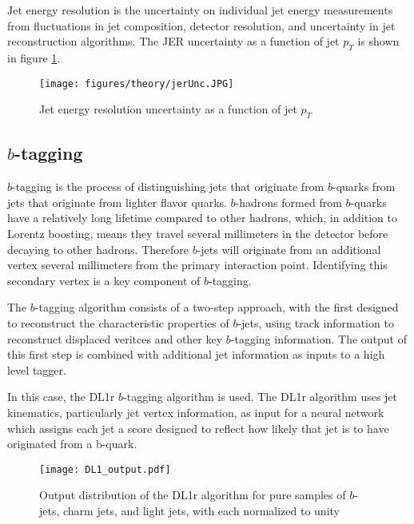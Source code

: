 Jet energy resolution is the uncertainty on individual jet energy measurements from fluctuations in jet composition, detector resolution, and uncertainty in jet reconstruction algorithms. The JER uncertainty as a function of jet $p_T$ is shown in figure \ref{fig:jerUnc}.

\begin{figure}[H]
\centering
   \texttt{[image: figures/theory/jerUnc.JPG]}
\caption{Jet energy resolution uncertainty as a function of jet $p_T$ \cite{atlascollaboration2020jet}}
\label{fig:jerUnc}
\end{figure}

\subsection{$b$-tagging}
\label{obj:bjets}

$b$-tagging is the process of distinguishing jets that originate from $b$-quarks from jets that originate from lighter flavor quarks. $b$-hadrons formed from $b$-quarks have a relatively long lifetime compared to other hadrons, which, in addition to Lorentz boosting, means they travel several millimeters in the detector before decaying to other hadrons. Therefore $b$-jets will originate from an additional vertex several millimeters from the primary interaction point. Identifying this secondary vertex is a key component of $b$-tagging.

The $b$-tagging algorithm consists of a two-step approach, with the first designed to reconstruct the characteristic properties of $b$-jets, using track information to reconstruct displaced veritces \cite{Heer:2017kbn} and other key $b$-tagging information. The output of this first step is combined with additional jet information as inputs to a high level tagger.

In this case, the DL1r $b$-tagging algorithm is used. The DL1r algorithm \cite{btag_cal} uses jet kinematics, particularly jet vertex information, as input for a neural network which assigns each jet a score designed to reflect how likely that jet is to have originated from a b-quark. 

\begin{figure}[H] 
    \centering
    \texttt{[image: DL1\_output.pdf]} 
    \caption{Output distribution of the DL1r algorithm for pure samples of $b$-jets, charm jets, and light jets, with each normalized to unity \cite{btag_cal}}
    \label{fig:DL1r}
\end{figure}

